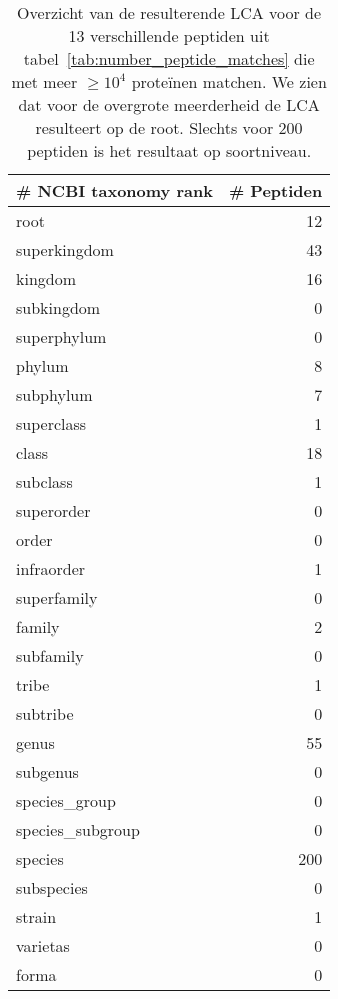 \begin{table}[h!]
    \centering
    \begin{tabular}{|l|r|}
        \hline
        \textbf{\# NCBI taxonomy rank} & \textbf{\# Peptiden} \\ \hline
        root & 12\thinspace369 \\ \hline
        superkingdom & 43 \\ \hline
        kingdom & 16 \\ \hline
        subkingdom & 0 \\ \hline
        superphylum & 0 \\ \hline
        phylum & 8 \\ \hline
        subphylum & 7 \\ \hline
        superclass & 1 \\ \hline
        class & 18 \\ \hline
        subclass & 1 \\ \hline
        superorder & 0 \\ \hline
        order & 0 \\ \hline
        infraorder & 1 \\ \hline
        superfamily & 0 \\ \hline
        family & 2 \\ \hline
        subfamily & 0 \\ \hline
        tribe & 1 \\ \hline
        subtribe & 0 \\ \hline
        genus & 55 \\ \hline
        subgenus & 0 \\ \hline
        species\_group & 0 \\ \hline
        species\_subgroup & 0 \\ \hline
        species & 200 \\ \hline
        subspecies & 0 \\ \hline
        strain & 1 \\ \hline
        varietas & 0 \\ \hline
        forma & 0 \\ \hline
    \end{tabular}
    \caption{Overzicht van de resulterende LCA voor de 13 verschillende peptiden uit tabel~\ref{tab:number_peptide_matches} die met meer $\geq 10^4$ proteïnen matchen. We zien dat voor de overgrote meerderheid de LCA resulteert op de root. Slechts voor 200 peptiden is het resultaat op soortniveau.}
    \label{tab:peptides_distribution}
\end{table}

